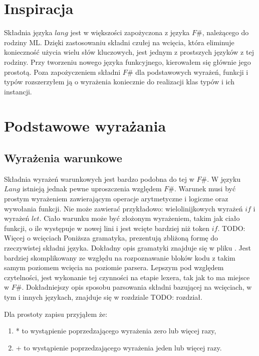 \documentclass[declaration,shortabstract]{iithesis}
\begin{document}
\section{Inspiracja}
Składnia języka $lang$ jest w większości zapożyczona z języka $F\#$, należącego
do rodziny ML. Dzięki zastosowaniu składni czułej na wcięcia, która eliminuje 
konieczność użycia wielu słów kluczowych, jest jednym z  prostszych języków z 
tej rodziny. Przy tworzeniu nowego języka funkcyjnego, kierowałem się głównie 
jego prostotą. Poza zapożyczeniem składni $F\#$ dla podstawowych wyrażeń, 
funkcji i typów rozszerzyłem ją o wyrażenia koniecznie do realizacji klas typów
i ich instancji.

\section{Podstawowe wyrażania}

\subsection{Wyrażenia warunkowe}

Składnia wyrażeń warunkowych jest bardzo podobna do tej w $F\#$. W języku $Lang$
istnieją jednak pewne uproszczenia względem $F\#$. 
Warunek musi być prostym wyrażeniem zawierającym operacje arytmetyczne i logiczne
oraz wywołania funkcji. Nie może zawierać przykładowo: wielolinijkowych wyrażeń
$if$ i wyrażeń $let$. Ciało warunku może być złożonym wyrażeniem, takim jak 
ciało funkcji, o ile występuje w nowej lini i jest wcięte bardziej niż 
token $if$. TODO: Więcej o wcięciach
Poniższa gramatyka, prezentują zbliżoną formę do rzeczywistej składni języka.
Dokładny opis gramatyki znajduje się w pliku 
. Jest bardziej skomplikowany
ze względu na rozpoznawanie bloków kodu z takim samym poziomem wcięcia na
poziomie parsera. Lepszym pod względem czytelności, jest wykonanie tej 
czynności na etapie lexera, tak jak to ma miejsce w $F\#$. Dokładniejszy opis 
sposobu parsowania składni bazującej na wcięciach, w tym i innych językach,
znajduje się w rozdziale TODO: rozdział. 

Dla prostoty zapisu przyjąłem że:
\begin{enumerate}
  \item * to wystąpienie poprzedzającego wyrażenia zero lub więcej razy,
  \item + to wystąpienie poprzedzającego wyrażenia jeden lub więcej razy.
\end{enumerate}
\end{document}
